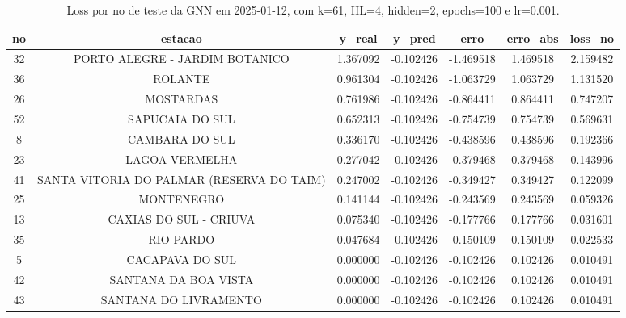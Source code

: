 \begin{table}[h]
\centering
\caption{Loss por no de teste da GNN em 2025-01-12, com k=61, HL=4, hidden=2, epochs=100 e lr=0.001.}
\label{tab:gnn_loss_k61_hl4_h2_e100_d20250112}
\begin{tabular}{ccccccc}
\toprule
no & estacao & y\_real & y\_pred & erro & erro\_abs & loss\_no \\
\midrule
32 & PORTO ALEGRE - JARDIM BOTANICO & 1.367092 & -0.102426 & -1.469518 & 1.469518 & 2.159482 \\
36 & ROLANTE & 0.961304 & -0.102426 & -1.063729 & 1.063729 & 1.131520 \\
26 & MOSTARDAS & 0.761986 & -0.102426 & -0.864411 & 0.864411 & 0.747207 \\
52 & SAPUCAIA DO SUL & 0.652313 & -0.102426 & -0.754739 & 0.754739 & 0.569631 \\
8 & CAMBARA DO SUL & 0.336170 & -0.102426 & -0.438596 & 0.438596 & 0.192366 \\
23 & LAGOA VERMELHA & 0.277042 & -0.102426 & -0.379468 & 0.379468 & 0.143996 \\
41 & SANTA VITORIA DO PALMAR (RESERVA DO TAIM) & 0.247002 & -0.102426 & -0.349427 & 0.349427 & 0.122099 \\
25 & MONTENEGRO & 0.141144 & -0.102426 & -0.243569 & 0.243569 & 0.059326 \\
13 & CAXIAS DO SUL - CRIUVA & 0.075340 & -0.102426 & -0.177766 & 0.177766 & 0.031601 \\
35 & RIO PARDO & 0.047684 & -0.102426 & -0.150109 & 0.150109 & 0.022533 \\
5 & CACAPAVA DO SUL & 0.000000 & -0.102426 & -0.102426 & 0.102426 & 0.010491 \\
42 & SANTANA DA BOA VISTA & 0.000000 & -0.102426 & -0.102426 & 0.102426 & 0.010491 \\
43 & SANTANA DO LIVRAMENTO & 0.000000 & -0.102426 & -0.102426 & 0.102426 & 0.010491 \\
\bottomrule
\end{tabular}
\end{table}
